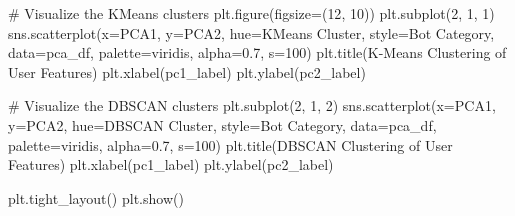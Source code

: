 \documentclass[
  12pt,
  letterpaper,
  DIV=11,
  numbers=noendperiod]{scrartcl}
\newenvironment{Shaded}{\begin{snugshade}}{\end{snugshade}}
\newcommand{\CommentTok}[1]{\textcolor[rgb]{0.37,0.37,0.37}{#1}}
\newcommand{\DecValTok}[1]{\textcolor[rgb]{0.68,0.00,0.00}{#1}}
\newcommand{\FloatTok}[1]{\textcolor[rgb]{0.68,0.00,0.00}{#1}}
\newcommand{\NormalTok}[1]{\textcolor[rgb]{0.00,0.23,0.31}{#1}}
\newcommand{\OperatorTok}[1]{\textcolor[rgb]{0.37,0.37,0.37}{#1}}
\newcommand{\StringTok}[1]{\textcolor[rgb]{0.13,0.47,0.30}{#1}}
\begin{document}
\begin{Shaded}
\begin{Highlighting}[]
\CommentTok{\# Visualize the KMeans clusters}
\NormalTok{plt.figure(figsize}\OperatorTok{=}\NormalTok{(}\DecValTok{12}\NormalTok{, }\DecValTok{10}\NormalTok{))}
\NormalTok{plt.subplot(}\DecValTok{2}\NormalTok{, }\DecValTok{1}\NormalTok{, }\DecValTok{1}\NormalTok{)}
\NormalTok{sns.scatterplot(x}\OperatorTok{=}\StringTok{\textquotesingle{}PCA1\textquotesingle{}}\NormalTok{, y}\OperatorTok{=}\StringTok{\textquotesingle{}PCA2\textquotesingle{}}\NormalTok{, hue}\OperatorTok{=}\StringTok{\textquotesingle{}KMeans Cluster\textquotesingle{}}\NormalTok{, style}\OperatorTok{=}\StringTok{\textquotesingle{}Bot Category\textquotesingle{}}\NormalTok{, data}\OperatorTok{=}\NormalTok{pca\_df, palette}\OperatorTok{=}\StringTok{\textquotesingle{}viridis\textquotesingle{}}\NormalTok{, alpha}\OperatorTok{=}\FloatTok{0.7}\NormalTok{, s}\OperatorTok{=}\DecValTok{100}\NormalTok{)}
\NormalTok{plt.title(}\StringTok{\textquotesingle{}K{-}Means Clustering of User Features\textquotesingle{}}\NormalTok{)}
\NormalTok{plt.xlabel(pc1\_label)}
\NormalTok{plt.ylabel(pc2\_label)}

\CommentTok{\# Visualize the DBSCAN clusters}
\NormalTok{plt.subplot(}\DecValTok{2}\NormalTok{, }\DecValTok{1}\NormalTok{, }\DecValTok{2}\NormalTok{)}
\NormalTok{sns.scatterplot(x}\OperatorTok{=}\StringTok{\textquotesingle{}PCA1\textquotesingle{}}\NormalTok{, y}\OperatorTok{=}\StringTok{\textquotesingle{}PCA2\textquotesingle{}}\NormalTok{, hue}\OperatorTok{=}\StringTok{\textquotesingle{}DBSCAN Cluster\textquotesingle{}}\NormalTok{, style}\OperatorTok{=}\StringTok{\textquotesingle{}Bot Category\textquotesingle{}}\NormalTok{, data}\OperatorTok{=}\NormalTok{pca\_df, palette}\OperatorTok{=}\StringTok{\textquotesingle{}viridis\textquotesingle{}}\NormalTok{, alpha}\OperatorTok{=}\FloatTok{0.7}\NormalTok{, s}\OperatorTok{=}\DecValTok{100}\NormalTok{)}
\NormalTok{plt.title(}\StringTok{\textquotesingle{}DBSCAN Clustering of User Features\textquotesingle{}}\NormalTok{)}
\NormalTok{plt.xlabel(pc1\_label)}
\NormalTok{plt.ylabel(pc2\_label)}

\NormalTok{plt.tight\_layout()}
\NormalTok{plt.show()}
\end{Highlighting}
\end{Shaded}
\end{document}
